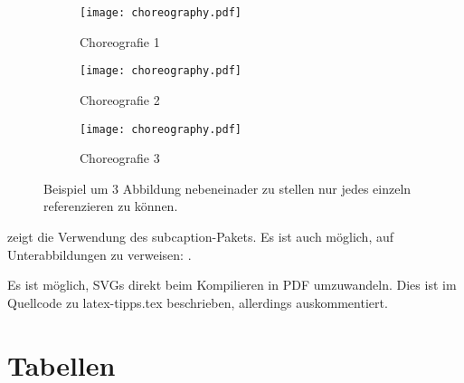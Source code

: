 \begin{figure}
  \hfill
  \begin{subfigure}{.3\textwidth}
    \texttt{[image: choreography.pdf]}
    \caption{Choreografie 1}
    \label{fig:subfigA}
  \end{subfigure}
  \hfill
  \begin{subfigure}{.3\textwidth}
    \texttt{[image: choreography.pdf]}
    \caption{Choreografie 2}
    \label{fig:subfigB}
  \end{subfigure}
  \hfill
  \begin{subfigure}{.3\textwidth}
    \texttt{[image: choreography.pdf]}
    \caption{Choreografie 3}
    \label{fig:subfigC}
  \end{subfigure}
  \caption{Beispiel um 3 Abbildung nebeneinader zu stellen nur jedes einzeln referenzieren zu können.}
  \label{fig:subfig_example}
\end{figure}

 zeigt die Verwendung des subcaption-Pakets.
Es ist auch möglich, auf Unterabbildungen zu verweisen: .

Es ist möglich, SVGs direkt beim Kompilieren in PDF umzuwandeln.
Dies ist im Quellcode zu latex-tipps.tex beschrieben, allerdings auskommentiert.

\iffalse %
  Das SVG in \cref{fig:directSVG} ist direkt eingebunden, während der Text im SVG in \cref{fig:latexSVG} mittels pdflatex gesetzt ist.
  Falls man die Graphiken sehen möchte, muss inkscape im PATH sein und im Tex-Quelltext \texttt{\textbackslash{}iffalse} und \texttt{\textbackslash{}iftrue} auskommentiert sein.

  \begin{figure}
    \centering
    \texttt{[image: svgexample.svg]}
    \caption{SVG direkt eingebunden}
    \label{fig:directSVG}
  \end{figure}

  \begin{figure}
    \centering
    \def\svgwidth{.4\textwidth}
    
    \caption{Text im SVG mittels \LaTeX{} gesetzt}
    \label{fig:latexSVG}
  \end{figure}
\fi %

\section{Tabellen}

